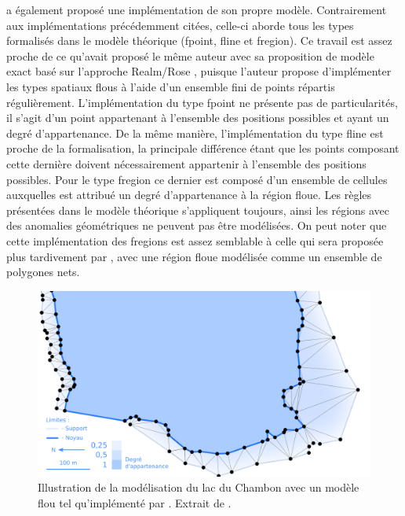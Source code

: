 \textcite{Schneider2003} a également proposé une implémentation de son
propre modèle. Contrairement aux implémentations précédemment citées,
celle-ci aborde tous les types formalisés dans le modèle théorique
(fpoint, fline et fregion). Ce travail est assez proche de ce qu’avait
proposé le même auteur avec sa proposition de modèle exact basé sur
l’approche Realm/Rose \textcite{Schneider1996}, puisque l’auteur
propose d’implémenter les types spatiaux flous à l’aide d’un ensemble
fini de points répartis régulièrement. L’implémentation du type fpoint
ne présente pas de particularités, il s’agit d’un point appartenant à
l’ensemble des positions possibles et ayant un degré
d’appartenance. De la même manière, l’implémentation du type fline est
proche de la formalisation, la principale différence étant que les
points composant cette dernière doivent nécessairement appartenir à
l’ensemble des positions possibles. Pour le type fregion ce dernier
est composé d’un ensemble de cellules auxquelles est attribué un degré
d’appartenance à la région floue. Les règles présentées dans le modèle
théorique s’appliquent toujours, ainsi les régions avec des anomalies
géométriques ne peuvent pas être modélisées. On peut noter que cette
implémentation des fregions est assez semblable à celle qui sera
proposée plus tardivement par \textcite{Kanjinal2010}, avec une région
floue modélisée comme un ensemble de polygones nets.

\begin{figure}
  \centering
  \includegraphics{../figures/fig10.png}
  \caption{Illustration de la modélisation du lac du Chambon avec un
    modèle flou tel qu’implémenté par \textcite{Dilo2007}. Extrait de
    \textcite{Bunel2020}.}
  \label{fig:champ_dilo}
\end{figure}


